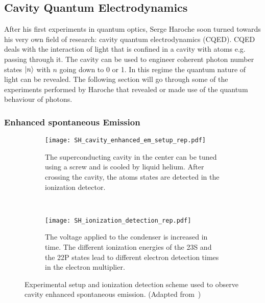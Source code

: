 \subsection{Cavity Quantum Electrodynamics}
\label{sec:CQED}
After his first experiments in quantum optics, Serge Haroche soon turned towards
his very own field of research: cavity quantum electrodynamics (CQED). CQED
deals with the interaction of light that is confined in a cavity with atoms
e.g. passing through it. The cavity can be used to engineer coherent photon number
states $\ket{n}$ with $n$ going down to 0 or 1. In this regime the quantum
nature of light can be revealed. The following section will go through some of
the experiments performed by Haroche that revealed or made use of the quantum
behaviour of photons. 

\subsubsection{Enhanced spontaneous Emission}
\label{sec:EnhancedSpontEm}

\begin{figure}[t]
  \centering
  \begin{subfigure}[t]{0.48\linewidth}
    \centering
    \texttt{[image: SH\_cavity\_enhanced\_em\_setup\_rep.pdf]}
    \caption{The superconducting cavity in the center can be tuned using a screw
    and is cooled by liquid helium. After crossing the cavity, the atoms states
  are detected in the ionization detector.}
    \label{fig:cavity_enhanced_setup}
  \end{subfigure}
  ~
  \begin{subfigure}[t]{0.48\linewidth}
    \centering
    \texttt{[image: SH\_ionization\_detection\_rep.pdf]}
    \caption{The voltage applied to the condenser is increased in time. The
    different ionization energies of the 23S and the 22P states lead to
  different electron detection times in the electron multiplier.}
    \label{fig:ionization_detection}
  \end{subfigure}
  \caption{Experimental setup and ionization detection scheme used to observe
  cavity enhanced spontaneous emission. (Adapted
from~\cite{haroche1983EnhancedSpontEm})}
  \label{}
\end{figure}

